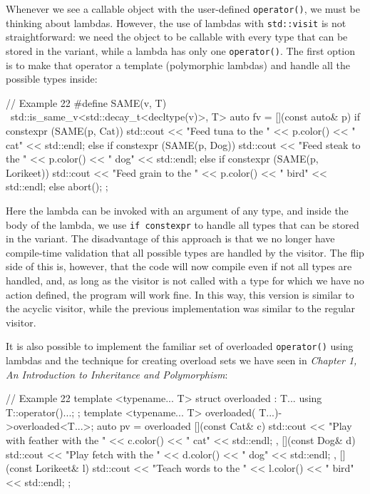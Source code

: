 Whenever we see a callable object with the user-defined \texttt{operator()}, we must be thinking about lambdas. However, the use of lambdas with \texttt{std::visit} is not straightforward: we need the object to be callable with every type that can be stored in the variant, while a lambda has only one \texttt{operator()}. The first option is to make that operator a template (polymorphic lambdas) and handle all the possible types inside:

\begin{code}
// Example 22
#define SAME(v, T) \
  std::is_same_v<std::decay_t<decltype(v)>, T>
auto fv = [](const auto& p) {
  if constexpr (SAME(p, Cat)) {
    std::cout << "Feed tuna to the " << p.color()
              << " cat" << std::endl; }
  else if constexpr (SAME(p, Dog)) {
    std::cout << "Feed steak to the " << p.color()
              << " dog" << std::endl; }
  else if constexpr (SAME(p, Lorikeet)) {
    std::cout << "Feed grain to the " << p.color()
              << " bird" << std::endl; }
  else abort();
};
\end{code}

Here the lambda can be invoked with an argument of any type, and inside the body of the lambda, we use \texttt{if\ constexpr} to handle all types that can be stored in the variant. The disadvantage of this approach is that we no longer have compile-time validation that all possible types are handled by the visitor. The flip side of this is, however, that the code will now compile even if not all types are handled, and, as long as the visitor is not called with a type for which we have no action defined, the program will work fine. In this way, this version is similar to the acyclic visitor, while the previous implementation was similar to the regular visitor.

It is also possible to implement the familiar set of overloaded \texttt{operator()} using lambdas and the technique for creating overload sets we have seen in \emph{Chapter 1, An Introduction to Inheritance and Polymorphism}:

\begin{code}
// Example 22
template <typename... T> struct overloaded : T... {
  using T::operator()...;
};
template <typename... T>
overloaded( T...)->overloaded<T...>;
auto pv = overloaded {
  [](const Cat& c) {
    std::cout << "Play with feather with the " << c.color()
              << " cat" << std::endl; },
  [](const Dog& d) {
    std::cout << "Play fetch with the " << d.color()
              << " dog" << std::endl; },
  [](const Lorikeet& l) {
    std::cout << "Teach words to the " << l.color()
              << " bird" << std::endl; }
};
\end{code}

